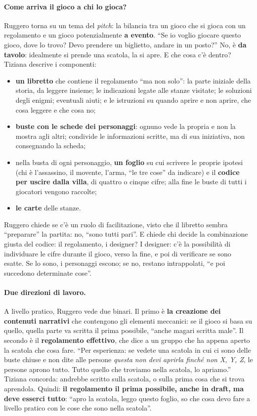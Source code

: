 \paragraph{Come arriva il gioco a chi lo gioca?} Ruggero torna su un tema del
\emph{pitch}: la bilancia tra un gioco che si gioca con un regolamento e un gioco
potenzialmente \textbf{a evento}. ``Se io voglio giocare questo gioco, dove lo trovo? Devo
prendere un biglietto, andare in un posto?'' No, è \textbf{da tavolo}: idealmente si prende
una scatola, la si apre. E che cosa c'è dentro? Tiziana descrive i componenti:
\begin{itemize}
  \item \textbf{un libretto} che contiene il regolamento ``ma non solo'': la parte iniziale
        della storia, da leggere insieme; le indicazioni legate alle stanze visitate; le
        soluzioni degli enigmi; eventuali aiuti; e le istruzioni su quando aprire e non
        aprire, che cosa leggere e che cosa no;
  \item \textbf{buste con le schede dei personaggi}: ognuno vede la propria e non la
        mostra agli altri; condivide le informazioni scritte, ma di sua iniziativa, non
        consegnando la scheda;
  \item nella busta di ogni personaggio, \textbf{un foglio} su cui scrivere le proprie
        ipotesi (chi è l'assassino, il movente, l'arma, ``le tre cose'' da indicare) e
        il \textbf{codice per uscire dalla villa}, di quattro o cinque cifre; alla fine le
        buste di tutti i giocatori vengono raccolte;
  \item \textbf{le carte} delle stanze.
\end{itemize}
Ruggero chiede se c'è un ruolo di facilitazione, visto che il libretto sembra ``preparare''
la partita: no, ``sono tutti pari''. E chiede chi decide la combinazione giusta del
codice: il regolamento, i designer? I designer: c'è la possibilità di individuare le cifre
durante il gioco, verso la fine, e poi di verificare se sono esatte. Se lo sono, i
personaggi escono; se no, restano intrappolati, ``e poi succedono determinate cose''.

\paragraph{Due direzioni di lavoro.} A livello pratico, Ruggero vede due binari. Il primo
è \textbf{la creazione dei contenuti narrativi} che contengono gli elementi meccanici: se
il gioco si basa su quello, quella parte va scritta il prima possibile, ``anche magari
scritta male''. Il secondo è il \textbf{regolamento effettivo}, che dice a un gruppo che
ha appena aperto la scatola che cosa fare. ``Per esperienza: se vedete una scatola in cui
ci sono delle buste chiuse e non dite alle persone \emph{questa non devi aprirla finché
non X, Y, Z}, le persone aprono tutto. Tutto quello che troviamo nella scatola, lo
apriamo.'' Tiziana concorda: andrebbe scritto sulla scatola, o sulla prima cosa che si
trova aprendola. Quindi: \textbf{il regolamento il prima possibile, anche in draft, ma
deve esserci tutto}: ``apro la scatola, leggo questo foglio, so che cosa devo fare a
livello pratico con le cose che sono nella scatola''.

